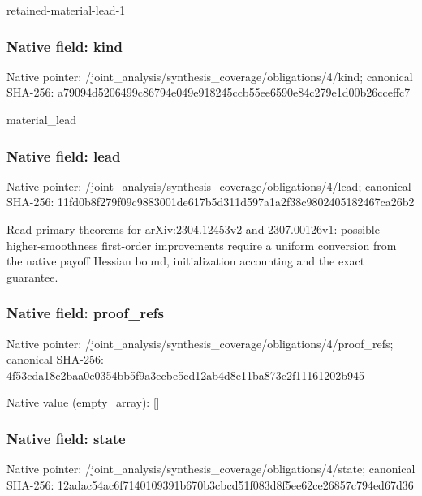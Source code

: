 \documentclass[10pt,a4paper]{article}
\begin{document}
\begingroup\raggedright\sloppy retained-material-lead-1\par\endgroup

\subsubsection{Native field: kind}
Native pointer: /joint\_\allowbreak{}analysis/synthesis\_\allowbreak{}coverage/obligations/4/kind; canonical SHA-256: a79094d5206499c86794e049e918245ccb55ee6590e84c279e1d00b26cceffc7

\begingroup\raggedright\sloppy material\_\allowbreak{}lead\par\endgroup

\subsubsection{Native field: lead}
Native pointer: /joint\_\allowbreak{}analysis/synthesis\_\allowbreak{}coverage/obligations/4/lead; canonical SHA-256: 11fd0b8f279f09c9883001de617b5d311d597a1a2f38c9802405182467ca26b2

\begingroup\raggedright\sloppy Read primary theorems for arXiv:\allowbreak{}2304.12453v2 and 2307.00126v1:\allowbreak{} possible higher-smoothness first-order improvements require a uniform conversion from the native payoff Hessian bound,\allowbreak{} initialization accounting and the exact guarantee.\par\endgroup

\subsubsection{Native field: proof\_\allowbreak{}refs}
Native pointer: /joint\_\allowbreak{}analysis/synthesis\_\allowbreak{}coverage/obligations/4/proof\_\allowbreak{}refs; canonical SHA-256: 4f53cda18c2baa0c0354bb5f9a3ecbe5ed12ab4d8e11ba873c2f11161202b945

Native value (empty\_\allowbreak{}array): []

\subsubsection{Native field: state}
Native pointer: /joint\_\allowbreak{}analysis/synthesis\_\allowbreak{}coverage/obligations/4/state; canonical SHA-256: 12adac54ac6f7140109391b670b3cbcd51f083d8f5ee62ce26857c794ed67d36
\end{document}
